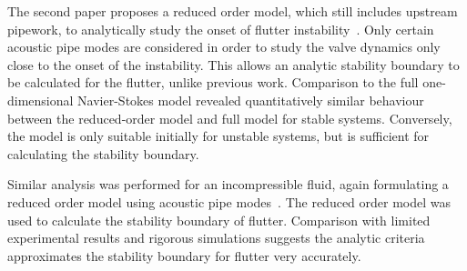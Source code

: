 The second paper proposes a reduced order model, which still includes upstream pipework, to analytically study the onset of flutter instability~\cite{Hos2015DynamicModelling}. Only certain acoustic pipe modes are considered in order to study the valve dynamics only close to the onset of the instability. This allows an analytic stability boundary to be calculated for the flutter, unlike previous work.
Comparison to the full one-dimensional Navier-Stokes model revealed quantitatively similar behaviour between the reduced-order model and full model for stable systems. Conversely, the model is only suitable initially for unstable systems, but is sufficient for calculating the stability boundary.

Similar analysis was performed for an incompressible fluid, again formulating a reduced order model using acoustic pipe modes~\cite{Hos2016DynamicService}. The reduced order model was used to calculate the stability boundary of flutter. Comparison with limited experimental results and rigorous simulations suggests the analytic criteria approximates the stability boundary for flutter very accurately.

